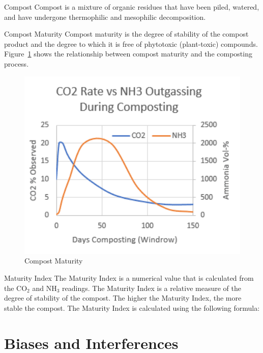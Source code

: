 \documentclass[12pt]{../SOP4_alpha}\usepackage[]{graphicx}\usepackage[]{xcolor}
\begin{document}
\begin{description*}

\item[Compost] Compost is a mixture of organic residues that have been piled, watered, and have undergone thermophilic and mesophilic decomposition.

\item[Compost Maturity] Compost maturity is the degree of stability of the compost product and the degree to which it is free of phytotoxic (plant-toxic) compounds. Figure~\ref{fig:CompostMaturity} shows the relationship between compost maturity and the composting process.

\begin{figure}[htbp]
   \centering
   \includegraphics[width=5in]{graphics/CompostCO2NH3} 
   \caption{Compost Maturity}
   \label{fig:CompostMaturity}
\end{figure}



\item[Maturity Index] The Maturity Index is a numerical value that is calculated from the CO$_2$ and NH$_3$ readings. The Maturity Index is a relative measure of the degree of stability of the compost. The higher the Maturity Index, the more stable the compost. The Maturity Index is calculated using the following formula:

\end{description*}

\section{Biases and Interferences}
\end{document}
